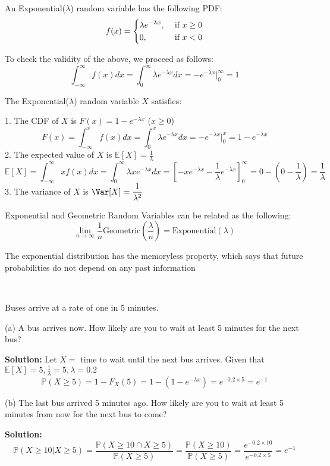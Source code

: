 \begin{definition}
    An Exponential(\(\lambda\)) random variable has the following PDF: 
    \[
        f(x) = \begin{dcases}
            \lambda e^{-\lambda x} , &\text{ if }  x \geq 0\\
            0 , &\text{ if } x < 0
        \end{dcases}
    \]
\end{definition}

To check the validity of the above, we proceed as follows:
\[
    \int_{-\infty}^{\infty} f(x)dx = \int_0^{\infty} \lambda e^{-\lambda x} dx = -e^{-\lambda x} \Big|_0^{\infty} = 1
\]

The Exponential(\(\lambda\)) random variable \(X\) satisfies:

1. The CDF of \(X\) is \(F(x) = 1 - e^{-\lambda x}\) (\(x \geq 0\))
\[
    F(x) = \int_{-\infty}^x f(x) dx = \int_{0}^x \lambda e^{-\lambda x} dx = -e^{-\lambda x} \Big|_0^x = 1 - e^{- \lambda x}
\]
2. The expected value of \(X\) is \(\mathbb{E}[X] = \frac{1}{\lambda}\)
\[
\mathbb{E}[X] = \int_{-\infty }^{\infty} xf(x) dx = \int_{0}^{\infty} \lambda x e^{-\lambda x} dx = \left[-xe^{-\lambda x} - \dfrac{1}{\lambda }e^{-\lambda x}\right]_0^{\infty} = 0 - (0 -\dfrac{1}{\lambda }) = \dfrac{1}{\lambda}
\]
3. The variance of \(X\) is \(\Var[X] = \dfrac{1}{\lambda^2}\) 

Exponential and Geometric Random Variables can be related as the following:
\[
    \lim_{n \to \infty} \dfrac{1}{n} \text{Geometric}(\dfrac{\lambda}{n}) = \text{Exponential}(\lambda) 
\]

The exponential distribution has the memoryless property, which says that future probabilities do not depend on any past information

\begin{eg}~ 

    Buses arrive at a rate of one in 5 minutes. 

    (a) A bus arrives now. How likely are you to wait at least 5 minutes for the next bus?

    \textbf{Solution:} 
    Let \(X = \) time to wait until the next bus arrives. Given that \(\mathbb{E}[X] = 5, \frac{1}{\lambda} = 5, \lambda = 0.2\) 
    \[
        \mathbb{P}(X \geq 5) = 1 - F_X(5) = 1 - (1 - e^{-\lambda x}) = e^{-0.2 \times 5} = e^{-1}
    \]

    (b) The last bus arrived 5 minutes ago. How likely are you to wait at least 5 minutes from now for the next bus to come?

    \textbf{Solution:} 
    \[
        \mathbb{P}(X \geq 10 \vert X \geq 5) = \dfrac{\mathbb{P}(X \geq 10 \cap X \geq 5)}{\mathbb{P}(X \geq 5)} = \dfrac{\mathbb{P}(X \geq 10)}{\mathbb{P}(X \geq 5)} = \dfrac{e^{-0.2 \times 10}}{e^{-0.2 \times 5}} = e^{-1}
    \]
\end{eg}

